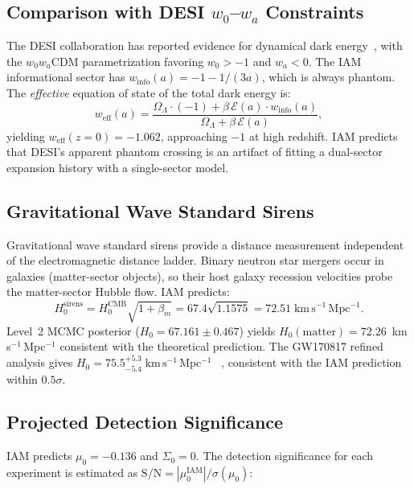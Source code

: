 \documentclass[11pt]{article}
\begin{document}
\subsection{Comparison with DESI $w_0$--$w_a$ Constraints}

The DESI collaboration has reported evidence for dynamical dark
energy~\citep{DESIDR1}, with the $w_0w_a$CDM parametrization favoring
$w_0 > -1$ and $w_a < 0$.  The IAM informational sector has
$w_\mathrm{info}(a) = -1 - 1/(3a)$, which is always phantom.  The
\textit{effective} equation of state of the total dark energy is:
\begin{equation}
w_\mathrm{eff}(a) = \frac{\Omega_\Lambda\cdot(-1)
  + \beta\,\mathcal{E}(a)\cdot w_\mathrm{info}(a)}
  {\Omega_\Lambda + \beta\,\mathcal{E}(a)},
\end{equation}
yielding $w_\mathrm{eff}(z{=}0) = -1.062$, approaching $-1$ at high
redshift.  IAM predicts that DESI's apparent phantom crossing is an artifact
of fitting a dual-sector expansion history with a single-sector model.

\subsection{Gravitational Wave Standard Sirens}

Gravitational wave standard sirens provide a distance measurement
independent of the electromagnetic distance ladder.  Binary neutron star
mergers occur in galaxies (matter-sector objects), so their host galaxy
recession velocities probe the matter-sector Hubble flow.  IAM predicts:
\begin{equation}
H_0^\mathrm{sirens} = H_0^\mathrm{CMB}\sqrt{1 + \beta_m}
= 67.4\sqrt{1.1575} = 72.51\;\mathrm{km\,s^{-1}\,Mpc^{-1}}.
\end{equation}
Level~2 MCMC posterior ($H_0 = 67.161 \pm 0.467$) yields
$H_0(\mathrm{matter}) = 72.26$~km\,s$^{-1}$\,Mpc$^{-1}$
consistent with the theoretical prediction.
The GW170817 refined analysis gives
$H_0 = 75.5^{+5.3}_{-5.4}\;\mathrm{km\,s^{-1}\,Mpc^{-1}}$
~\citep{Abbott2017siren,Nicolaou2023},
consistent with the IAM prediction within $0.5\sigma$.

\subsection{Projected Detection Significance}

IAM predicts $\mu_0 = -0.136$ and $\Sigma_0 = 0$.  The detection
significance for each experiment is estimated as
$\mathrm{S/N} = |\mu_0^\mathrm{IAM}|/\sigma(\mu_0)$:
\end{document}

